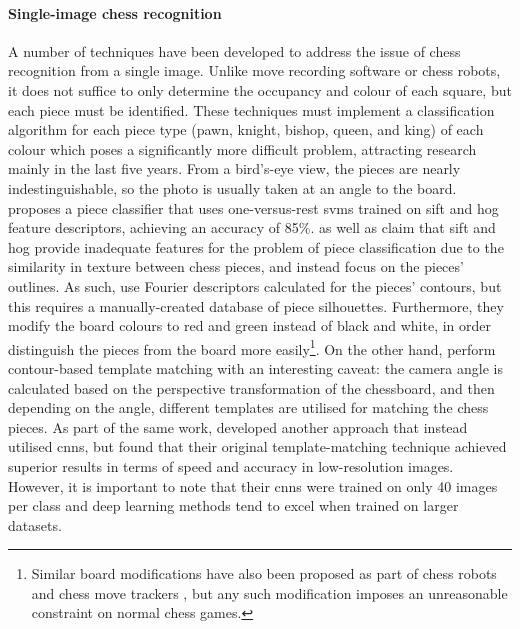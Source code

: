 \documentclass[../../main.tex]{subfiles}
\begin{document}
\paragraph{Single-image chess recognition}
A number of techniques have been developed to address the issue of chess recognition from a single image. 
Unlike move recording software or chess robots, it does not suffice to only determine the occupancy and colour of each square, but each piece must be identified.
These techniques must implement a classification algorithm for each piece type (pawn, knight, bishop, queen, and king) of each colour which poses a significantly more difficult problem, attracting research mainly in the last five years.
From a bird's-eye view, the pieces are nearly indestinguishable, so the photo is usually taken at an angle to the board.
\textcite{ding2016} proposes a piece classifier that uses one-versus-rest \glspl{svm} trained on \gls{sift} and \gls{hog} feature descriptors, achieving an accuracy of 85\%. 
\textcite{danner2015} as well as \textcite{xie2018} claim that \gls{sift} and \gls{hog} provide inadequate features for the problem of piece classification due to the similarity in texture between chess pieces, and instead focus on the pieces' outlines.
As such, \textcite{danner2015} use Fourier descriptors calculated for the pieces' contours, but this requires a manually-created database of piece silhouettes.
Furthermore, they modify the board colours to red and green instead of black and white, in order distinguish the pieces from the board more easily\footnote{Similar board modifications have also been proposed as part of chess robots \cite{banerjee2012} and chess move trackers \cite{wang2013}, but any such modification imposes an unreasonable constraint on normal chess games.}.
On the other hand, \textcite{xie2018} perform contour-based template matching with an interesting caveat: the camera angle is calculated based on the perspective transformation of the chessboard, and then depending on the angle, different templates are utilised for matching the chess pieces.
As part of the same work, \citeauthor{xie2018} developed another approach that instead utilised \glspl{cnn}, but found that their original template-matching technique achieved superior results in terms of speed and accuracy in low-resolution images.
However, it is important to note that their \glspl{cnn} were trained on only 40 images per class and deep learning methods tend to excel when trained on larger datasets.
\end{document}
